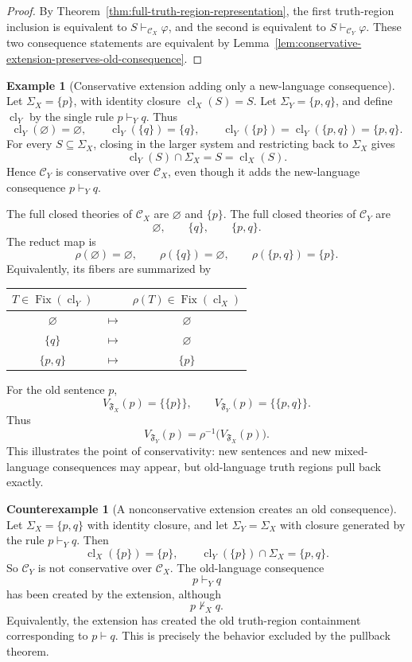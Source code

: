 \documentclass[11pt]{amsart}
\numberwithin{equation}{section}
\theoremstyle{plain}
\theoremstyle{definition}
\newtheorem{example}[theorem]{Example}
\newtheorem{counterexample}[theorem]{Counterexample}
\theoremstyle{remark}
\newcommand{\Cl}{\operatorname{cl}}
\newcommand{\Fix}{\operatorname{Fix}}
\newcommand{\C}{\mathcal C}
\newcommand{\F}{\mathfrak F}
\newcommand{\Sig}{\Sigma}
\begin{document}
\begin{proof}
By Theorem~\ref{thm:full-truth-region-representation}, the first truth-region inclusion is equivalent to \(S\vdash_{\C_X}\varphi\), and the second is equivalent to \(S\vdash_{\C_Y}\varphi\). These two consequence statements are equivalent by Lemma~\ref{lem:conservative-extension-preserves-old-consequence}.
\end{proof}

\begin{example}[Conservative extension adding only a new-language consequence]
\label{ex:conservative-extension-new-language-consequence}
Let \(\Sig_X=\{p\}\), with identity closure \(\Cl_X(S)=S\).  Let \(\Sig_Y=\{p,q\}\), and define \(\Cl_Y\) by the single rule \(p\vdash_Y q\).  Thus
\[
  \Cl_Y(\varnothing)=\varnothing,
  \qquad
  \Cl_Y(\{q\})=\{q\},
  \qquad
  \Cl_Y(\{p\})=\Cl_Y(\{p,q\})=\{p,q\}.
\]
For every \(S\subseteq\Sig_X\), closing in the larger system and restricting back to \(\Sig_X\) gives
\[
  \Cl_Y(S)\cap\Sig_X=S=\Cl_X(S).
\]
Hence \(\C_Y\) is conservative over \(\C_X\), even though it adds the new-language consequence \(p\vdash_Y q\).

The full closed theories of \(\C_X\) are \(\varnothing\) and \(\{p\}\).  The full closed theories of \(\C_Y\) are
\[
  \varnothing,
  \qquad
  \{q\},
  \qquad
  \{p,q\}.
\]
The reduct map is
\[
  \rho(\varnothing)=\varnothing,
  \qquad
  \rho(\{q\})=\varnothing,
  \qquad
  \rho(\{p,q\})=\{p\}.
\]
Equivalently, its fibers are summarized by
\begin{center}
\small
\renewcommand{\arraystretch}{1.12}
\begin{tabular}{@{}c c c@{}}
\toprule
$T\in\Fix(\Cl_Y)$ & & $\rho(T)\in\Fix(\Cl_X)$ \\
\midrule
$\varnothing$ & $\mapsto$ & $\varnothing$ \\
$\{q\}$ & $\mapsto$ & $\varnothing$ \\
$\{p,q\}$ & $\mapsto$ & $\{p\}$ \\
\bottomrule
\end{tabular}
\end{center}
For the old sentence \(p\),
\[
  V_{\F_X}(p)=\{\{p\}\},
  \qquad
  V_{\F_Y}(p)=\{\{p,q\}\}.
\]
Thus
\[
  V_{\F_Y}(p)=\rho^{-1}\bigl(V_{\F_X}(p)\bigr).
\]
This illustrates the point of conservativity: new sentences and new mixed-language consequences may appear, but old-language truth regions pull back exactly.
\end{example}
\begin{counterexample}[A nonconservative extension creates an old consequence]
\label{cex:nonconservative-extension-creates-old-consequence}
Let \(\Sig_X=\{p,q\}\) with identity closure, and let \(\Sig_Y=\Sig_X\) with closure generated by the rule \(p\vdash_Y q\).  Then
\[
  \Cl_X(\{p\})=\{p\},
  \qquad
  \Cl_Y(\{p\})\cap\Sig_X=\{p,q\}.
\]
So \(\C_Y\) is not conservative over \(\C_X\).  The old-language consequence
\[
  p\vdash_Y q
\]
has been created by the extension, although
\[
  p\nvdash_X q.
\]
Equivalently, the extension has created the old truth-region containment corresponding to \(p\vdash q\).  This is precisely the behavior excluded by the pullback theorem.
\end{counterexample}
\end{document}
